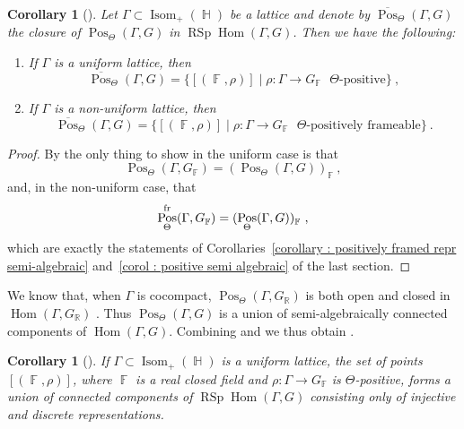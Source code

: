 \documentclass{amsart}
\theoremstyle{plain}
\newtheorem{corollary}[proposition]{Corollary}
\theoremstyle{definition}
\DeclareMathOperator{\Hom}{Hom}
\DeclareMathOperator{\Isom}{Isom}
\DeclareMathOperator{\rsp}{RSp}
\DeclareMathOperator{\Pos}{Pos}
\DeclareMathOperator{\Fb}{{\mathbb{F}}}
\DeclareMathOperator{\Hb}{\mathbb{H}}
\DeclareMathOperator{\Rb}{{\mathbb{R}}}
\newcommand{\fr}{\textnormal{fr}}
\newcommand{\1}{\mathbf{1}}
\begin{document}
\begin{corollary}[]
\label{coro in text: coro:Positive = limit of positive}
    Let $\Gamma \subset \Isom_+(\Hb)$ be a lattice and denote by $\overline{\Pos}_\Theta(\Gamma,G)$ the closure of $\Pos_\Theta(\Gamma,G)$ in $\rsp\Hom(\Gamma,G)$. Then we have the following:
    \begin{enumerate}
        \item If $\Gamma$ is a uniform lattice, then 
        \[\overline{\Pos}_\Theta(\Gamma, G) = \{[(\Fb,\rho)] \mid \rho\colon \Gamma \to G_{\Fb} \textrm{ $\Theta$-positive}\}~,\]

        \item If $\Gamma$ is a non-uniform lattice, then
        \[\overline{\Pos}_\Theta(\Gamma, G) = \{[(\Fb,\rho)]\mid \rho \colon \Gamma \to G_{\Fb} \textrm{ $\Theta$-positively frameable}\}~.\]
    \end{enumerate}
\end{corollary}

\begin{proof}
    By  the only thing to show in the uniform case is that
    \[\Pos_\Theta(\Gamma,G_{\Fb})= (\Pos_\Theta(\Gamma,G))_{\Fb}~,\]
    and, in the non-uniform case, that 
    \[\Pos^\fr_\Theta(\Gamma,G_{\Fb})= (\Pos_\Theta(\Gamma,G))_{\Fb}~,\]
    which are exactly the statements of Corollaries~\ref{corollary : positively framed repr semi-algebraic} and~\ref{corol : positive semi algebraic} of the last section.
\end{proof}

We know that, when $\Gamma$ is cocompact, $\Pos_\Theta(\Gamma,G_{\Rb})$ is both open and closed in $\Hom(\Gamma,G_{\Rb})$ \cite{GLW, BeyrerGuichardLabouriePozzettiWienhard_PositivityCrossRatiosCollarLemma}.
Thus $\Pos_\Theta(\Gamma,G)$ is a union of semi-algebraically connected components of $\Hom(\Gamma,G)$.
Combining  and  we thus obtain .

\begin{corollary}[]
    If $\Gamma\subset \Isom_+(\Hb)$ is a uniform lattice, the set of points $[(\Fb,\rho)]$, where $\Fb$ is a real closed field and $\rho\colon \Gamma \to G_{\Fb}$ is $\Theta$-positive, forms a union of connected components of $\rsp \Hom(\Gamma, G)$ consisting only of injective and discrete representations.
\end{corollary}
\end{document}
